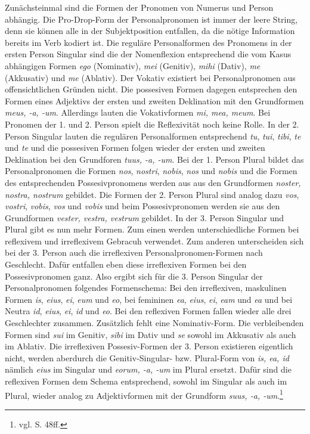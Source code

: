 \documentclass[12pt,abstract=on,titlepage,bibliography=totoc,ngerman,listof=totoc]{scrreprt}
\begin{document}
Zunächsteinmal sind die Formen der Pronomen von Numerus und Person abhängig. Die Pro-Drop-Form der Personalpronomen ist immer der leere String, denn sie können alle in der Subjektposition entfallen, da die nötige Information bereits im Verb kodiert ist. Die reguläre Personalformen des Pronomens in der ersten Person Singular sind die der Nomenflexion entsprechend die vom Kasus abhängigen Formen \textit{ego} (Nominativ), \textit{mei} (Genitiv), \textit{mihi} (Dativ), \textit{me} (Akkusativ) und \textit{me} (Ablativ). Der Vokativ existiert bei Personalpronomen aus offensichtlichen Gründen nicht. Die possesiven Formen dagegen entsprechen den Formen eines Adjektivs der ersten und zweiten Deklination mit den Grundformen \textit{meus, -a, -um}. Allerdings lauten die Vokativformen \textit{mi, mea, meum}. Bei Pronomen der 1. und 2. Person spielt die Reflexivität noch keine Rolle. In der 2. Person Singular lauten die regulären Personalformen entsprechend \textit{tu}, \textit{tui}, \textit{tibi}, \textit{te} und \textit{te} und die possesiven Formen folgen wieder der ersten und zweiten Deklination bei den Grundforen \textit{tuus, -a, -um}. Bei der 1. Person Plural bildet das Personalpronomen die Formen \textit{nos}, \textit{nostri}, \textit{nobis}, \textit{nos} und \textit{nobis} und die Formen des entsprechenden Possesivpronomens werden aus aus den Grundformen \textit{noster, nostra, nostrum} gebildet. Die Formen der 2. Person Plural sind analog dazu \textit{vos}, \textit{vostri}, \textit{vobis}, \textit{vos} und \textit{vobis} und beim Possesivpronomen werden sie aus den Grundformen \textit{vester, vestra, vestrum} gebildet. In der 3. Person Singular und Plural gibt es nun mehr Formen. Zum einen werden unterschiedliche Formen bei reflexivem und irreflexivem Gebracuh verwendet. Zum anderen unterscheiden sich bei der 3. Person auch die irreflexiven Personalpronomen-Formen nach Geschlecht. Dafür entfallen eben diese irreflexiven Formen bei den Possesivpronomen ganz. Also ergibt sich für die 3. Person Singular der Personalpronomen folgendes Formenschema: Bei den irreflexiven, maskulinen Formen \textit{is}, \textit{eius}, \textit{ei}, \textit{eum} und \textit{eo}, bei femininen \textit{ea}, \textit{eius}, \textit{ei}, \textit{eam} und \textit{ea} und bei Neutra \textit{id}, \textit{eius}, \textit{ei}, \textit{id} und \textit{eo}. Bei den reflexiven Formen fallen wieder alle drei Geschlechter zusammen. Zusätzlich fehlt eine Nominativ-Form. Die verbleibenden Formen sind \textit{sui} im Genitiv, \textit{sibi} im Dativ und \textit{se} sowohl im Akkusativ als auch im Ablativ. Die irreflexiven Possesiv-Formen der 3. Person existieren eigentlich nicht, werden aberdurch die Genitiv-Singular- bzw. Plural-Form von \textit{is, ea, id} nämlich \textit{eius} im Singular und \textit{eorum, -a, -um} im Plural ersetzt. Dafür sind die reflexiven Formen dem Schema entsprechend, sowohl im Singular als auch im Plural, wieder analog zu Adjektivformen mit der Grundform \textit{suus, -a, -um}.\footnote{vgl. \cite{BAYER-LINDAUER1994} S. 48ff.} \par
\end{document}
